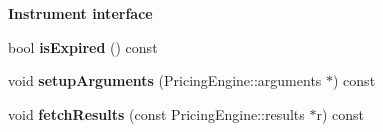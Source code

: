 \begin{Indent}{\bf Instrument interface}\par
\begin{DoxyCompactItemize}
\item 
bool {\bfseries is\+Expired} () const \label{class_quant_lib_1_1_c_p_i_cap_floor_a8673a7890e80c53d75eb52f87e71759a}

\item 
void {\bfseries setup\+Arguments} (Pricing\+Engine\+::arguments $\ast$) const \label{class_quant_lib_1_1_c_p_i_cap_floor_a5bb612df5ed39e367f47bab4f0ad137e}

\item 
void {\bfseries fetch\+Results} (const Pricing\+Engine\+::results $\ast$r) const \label{class_quant_lib_1_1_c_p_i_cap_floor_a375ca0ae287022b933d9a8e5151f91a6}

\end{DoxyCompactItemize}
\end{Indent}
